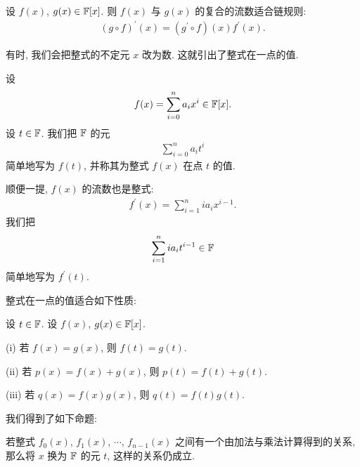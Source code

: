 \begin{proposition}
    设 $f(x)$, $g(x) \in \mathbb{F}[x]$. 则 $f(x)$ 与 $g(x)$ 的复合的流数适合链规则:
    \begin{align*}
        (g \circ f)^{\prime} (x) = (g^{\prime} \circ f)(x) f^{\prime} (x).
    \end{align*}
\end{proposition}

有时, 我们会把整式的不定元 $x$ 改为数. 这就引出了整式在一点的值.

\begin{definition}
    设
    \begin{align*}
        f(x) = \sum_{i=0}^n a_i x^i \in \mathbb{F}[x].
    \end{align*}
    设 $t \in \mathbb{F}$. 我们把 $\mathbb{F}$ 的元
    \begin{align*}
        \sum_{i=0}^n a_i t^i
    \end{align*}
    简单地写为 $f(t)$, 并称其为整式 $f(x)$ 在点 $t$ 的值.

    顺便一提, $f(x)$ 的流数也是整式:
    \begin{align*}
        f^{\prime} (x) = \sum_{i = 1}^{n} i a_i x^{i - 1}.
    \end{align*}
    我们把
    \begin{align*}
        \sum_{i = 1}^{n} i a_i t^{i - 1} \in \mathbb{F}
    \end{align*}
    简单地写为 $f^{\prime} (t)$.
\end{definition}

整式在一点的值适合如下性质:
\begin{proposition}
    设 $t \in \mathbb{F}$. 设 $f(x)$, $g(x) \in \mathbb{F}[x]$.

    (i) 若 $f(x) = g(x)$, 则 $f(t) = g(t)$.

    (ii) 若 $p(x) = f(x) + g(x)$, 则 $p(t) = f(t) + g(t)$.

    (iii) 若 $q(x) = f(x) g(x)$, 则 $q(t) = f(t) g(t)$.
\end{proposition}

我们得到了如下命题:
\begin{proposition}
    若整式 $f_0 (x)$, $f_1 (x)$, $\cdots$, $f_{n-1} (x)$ 之间有一个由加法与乘法计算得到的关系, 那么将 $x$ 换为 $\mathbb{F}$ 的元 $t$, 这样的关系仍成立.
\end{proposition}

